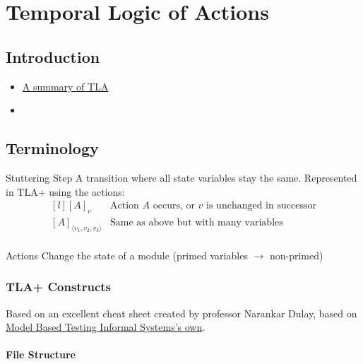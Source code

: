 \chapter{Temporal Logic of Actions}

\section{Introduction}



\begin{itemize}
    \item \href{https://lamport.azurewebsites.net/tla/summary-standalone.pdf}{A summary of TLA}
    \item 
\end{itemize}


\unfinished

\section{Terminology}
\begin{definitionbox}{Stuttering Step}
    A transition where all state variables stay the same. Represented in TLA+ using the actions:
    \[\begin{matrix*}[l]
        [A]_v & \text{Action }A \text{ occurs, or }v \text{ is unchanged in successor} \\
        [A]_{\langle v_1,v_2,v_3\rangle} & \text{Same as above but with many variables} \\
    \end{matrix*}\]
\end{definitionbox}
\begin{definitionbox}{Actions}
    Change the state of a module (primed variables $\to$ non-primed)
\end{definitionbox}
\subsection{TLA+ Constructs}
Based on an excellent cheat sheet created by professor Narankar Dulay, based on \href{https://mbt.informal.systems/docs/tla_basics_tutorials/tla+cheatsheet.html}{Model Based Testing \@ Informal Systems's own}.

\subsubsection{File Structure}
\begin{minipage}{.48\textwidth}
    
\end{minipage}
\hfill
\begin{minipage}{.48\textwidth}
    \inputminted{text}{tla_plus/code/ExampleFile.tla}
\end{minipage}
\vspace{.3cm}

